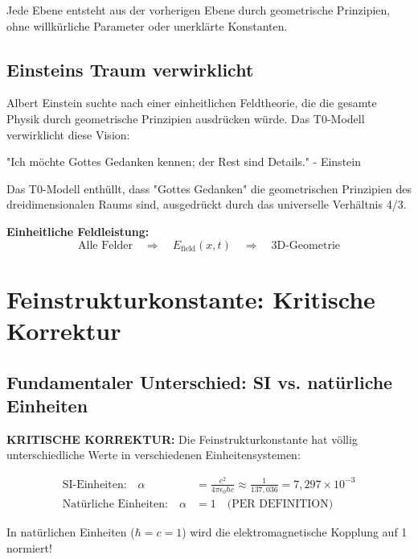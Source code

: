 \documentclass[12pt,a4paper]{report}
\begin{document}
	Jede Ebene entsteht aus der vorherigen Ebene durch geometrische Prinzipien, ohne willkürliche Parameter oder unerklärte Konstanten.
	
	\subsection{Einsteins Traum verwirklicht}
	\label{subsec:einstein_dream}
	
	Albert Einstein suchte nach einer einheitlichen Feldtheorie, die die gesamte Physik durch geometrische Prinzipien ausdrücken würde. Das T0-Modell verwirklicht diese Vision:
	
	\begin{tcolorbox}[colback=green!5!white,colframe=green!75!black,title=Einsteins Vision verwirklicht]
		"Ich möchte Gottes Gedanken kennen; der Rest sind Details." - Einstein
		
		Das T0-Modell enthüllt, dass "Gottes Gedanken" die geometrischen Prinzipien des dreidimensionalen Raums sind, ausgedrückt durch das universelle Verhältnis 4/3.
	\end{tcolorbox}
	
	\textbf{Einheitliche Feldleistung:}
	\begin{equation}
		\text{Alle Felder} \quad \Rightarrow \quad E_{\text{field}}(x,t) \quad \Rightarrow \quad \text{3D-Geometrie}
	\end{equation}
	
	\section{Feinstrukturkonstante: Kritische Korrektur}
	\label{sec:fine_structure_correction}
	
	\subsection{Fundamentaler Unterschied: SI vs. natürliche Einheiten}
	\label{subsec:si_vs_natural_units}
	
	\textbf{KRITISCHE KORREKTUR:} Die Feinstrukturkonstante hat völlig unterschiedliche Werte in verschiedenen Einheitensystemen:
	
	\begin{tcolorbox}[colback=red!10!white,colframe=red!75!black,title=KRITISCHER PUNKT]
		\begin{align}
			\text{SI-Einheiten:} \quad \alpha &= \frac{e^2}{4\pi\epsilon_0\hbar c} \approx \frac{1}{137,036} = 7,297 \times 10^{-3} \\
			\text{Natürliche Einheiten:} \quad \alpha &= 1 \quad \text{(PER DEFINITION)}
		\end{align}
		
		In natürlichen Einheiten ($\hbar = c = 1$) wird die elektromagnetische Kopplung auf 1 normiert!
	\end{tcolorbox}
	
\end{document}
